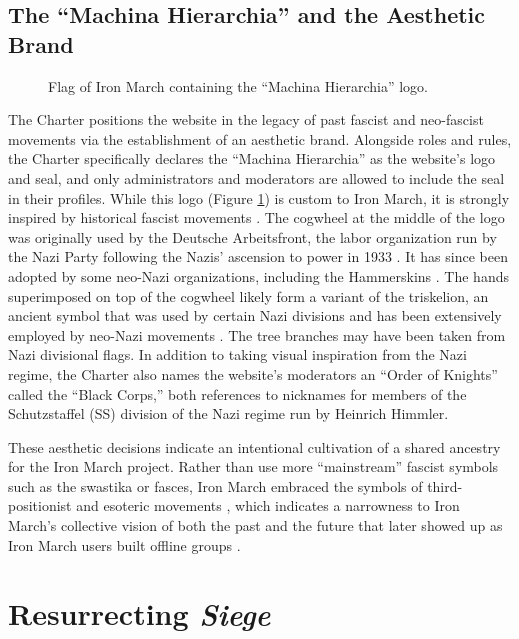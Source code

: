 \documentclass[bibtex,autowc,nonblind]{apsr_submission}
\begin{document}
\subsection{The ``Machina Hierarchia'' and the Aesthetic Brand}

\begin{figure}
    \centering
    
    \caption{Flag of Iron March containing the ``Machina Hierarchia'' logo.}
    \label{fig:im-logo}
\end{figure}

The Charter positions the website in the legacy of past fascist and neo-fascist movements via the establishment of an aesthetic brand. Alongside roles and rules, the Charter specifically declares the ``Machina Hierarchia'' as the website's logo and seal, and only administrators and moderators are allowed to include the seal in their profiles. While this logo (Figure \ref{fig:im-logo}) is custom to Iron March, it is strongly inspired by historical fascist movements \citep{milleridriss2020hate}. The cogwheel at the middle of the logo was originally used by the Deutsche Arbeitsfront, the labor organization run by the Nazi Party following the Nazis' ascension to power in 1933 \citep{davis1994flags}. It has since been adopted by some neo-Nazi organizations, including the Hammerskins \citep{adl_hammerskins}. The hands superimposed on top of the cogwheel likely form a variant of the triskelion, an ancient symbol that was used by certain Nazi divisions and has been extensively employed by neo-Nazi movements \citep{dyck2016reichsrock}. The tree branches may have been taken from Nazi divisional flags. In addition to taking visual inspiration from the Nazi regime, the Charter also names the website's moderators an ``Order of Knights'' called the ``Black Corps,'' both references to nicknames for members of the Schutzstaffel (SS) division of the Nazi regime run by Heinrich Himmler.

These aesthetic decisions indicate an intentional cultivation of a shared ancestry for the Iron March project. Rather than use more ``mainstream'' fascist symbols such as the swastika or fasces, Iron March embraced the symbols of third-positionist and esoteric movements \citep{milleridriss2020hate}, which indicates a narrowness to Iron March's collective vision of both the past and the future that later showed up as Iron March users built offline groups \citep{upchurch}.

\section{Resurrecting \textit{Siege}}
\end{document}
